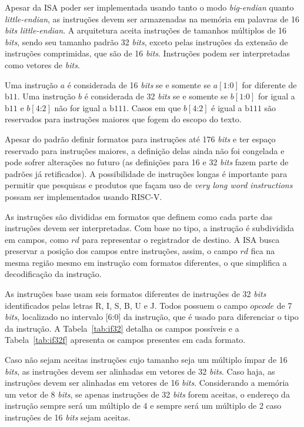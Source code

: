   Apesar da ISA poder ser implementada usando tanto o modo \emph{big-endian} quanto \emph{little-endian},
  as instruções devem ser armazenadas na memória em palavras de 16 \emph{bits little-endian}.
  A arquitetura aceita instruções de tamanhos múltiplos de 16 \emph{bits}, sendo seu tamanho padrão
  32 \emph{bits}, exceto pelas instruções da extensão de instruções comprimidas, que são de 16 \emph{bits}.
  Instruções podem ser interpretadas como vetores de \emph{bits}.

  Uma instrução $a$ é considerada de 16 \emph{bits} se e somente se $a[1\text{:}0]$ for diferente de $\text{b}11$.
  Uma instrução $b$ é considerada de 32 \emph{bits} se e somente se $b[1\text{:}0]$ for igual a $\text{b}11$ 
  e $b[4\text{:}2]$ não for igual a $\text{b}111$. Casos em que $b[4\text{:}2]$ é igual a $\text{b}111$ são
  reservados para instruções maiores que fogem do escopo do texto.

  Apesar do padrão definir formatos para instruções até 176 \emph{bits} e ter espaço reservado para instruções
  maiores, a definição delas ainda não foi congelada e pode sofrer alterações no futuro 
  (as definições para 16 e 32 \emph{bits} fazem parte de padrões já retificados).
  A possibilidade de instruções longas é importante para permitir que pesquisas e produtos que façam uso de 
  \emph{very long word instructions} \citep{VLWI} possam ser implementados usando RISC-V.
  
  As instruções são divididas em formatos que definem como cada parte das instruções devem ser interpretadas. 
  Com base no tipo, a instrução é subdividida em campos, como $rd$ para representar o registrador de destino.
  A ISA busca preservar a posição dos campos entre instruções, assim, o campo $rd$ fica na mesma região mesmo
  em instrução com formatos diferentes, o que simplifica a decodificação da instrução.

  As instruções base usam seis formatos diferentes de instruções de 32 \emph{bits} identificados pelas letras 
  R, I, S, B, U e J. Todos possuem o campo $opcode$ de 7 \emph{bits}, localizado no intervalo [6:0] 
  da instrução, que é usado para diferenciar o tipo da instrução. 
  A Tabela~\ref{tab:if32} detalha os campos possíveis e a Tabela~\ref{tab:if32f} apresenta os campos presentes em cada formato.

  Caso não sejam aceitas instruções cujo tamanho seja um múltiplo ímpar de 16 \emph{bits}, as instruções 
  devem ser alinhadas em vetores de 32 \emph{bits}. Caso haja, as instruções devem ser alinhadas em 
  vetores de 16 \emph{bits}. Considerando a memória um vetor de 8 \emph{bits}, se apenas instruções de 
  32 \emph{bits} forem aceitas, o endereço da instrução sempre será um múltiplo de 4 e sempre será um 
  múltiplo de 2 caso instruções de 16 \emph{bits} sejam aceitas.

